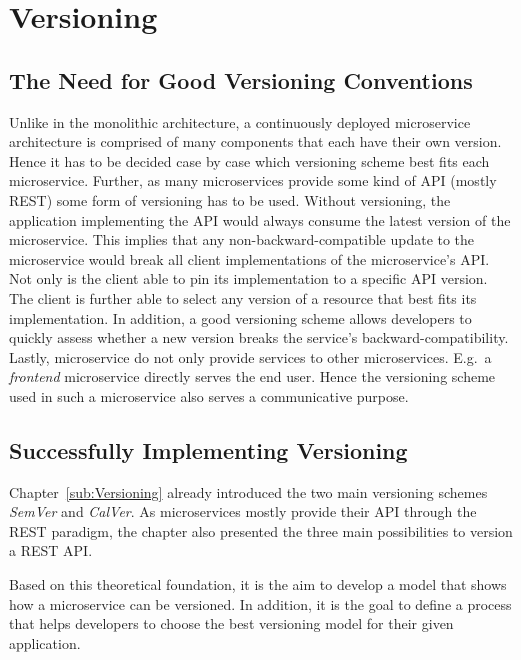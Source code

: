 
\section{Versioning}%
\label{sec:Versioning}

\subsection{The Need for Good Versioning Conventions}%
\label{sub:The_Need_for_Good_Versioning_Conventions}
Unlike in the monolithic architecture, a continuously deployed microservice
architecture is comprised of many components that each have their own version.
Hence it has to be decided case by case which versioning scheme best fits each
microservice. Further, as many microservices provide some kind of \ac{API}
(mostly \ac{REST}) some form of versioning has to be used. Without versioning,
the application implementing the \ac{API} would always consume the latest
version of the microservice. This implies that any non-backward-compatible
update to the microservice would break all client implementations of the
microservice's \ac{API}. Not only is the client able to pin its implementation
to a specific \ac{API} version. The client is further able to select any
version of a resource that best fits its implementation. In addition, a good
versioning scheme allows developers to quickly assess whether a new version
breaks the service's backward-compatibility. Lastly, microservice do not only
provide services to other microservices. E.g.\ a \textit{frontend} microservice
directly serves the end user. Hence the versioning scheme used in such a
microservice also serves a communicative purpose.


\subsection{Successfully Implementing Versioning}%
\label{sub:Successfully_Implementing_Versioning}
Chapter~\ref{sub:Versioning} already introduced the two main versioning schemes
\textit{SemVer} and \textit{CalVer}. As microservices mostly provide their
\ac{API} through the \ac{REST} paradigm, the chapter also presented the three
main possibilities to version a \ac{REST} \ac{API}.

Based on this theoretical foundation, it is the aim to develop a model that
shows how a microservice can be versioned. In addition, it is the goal to
define a process that helps developers to choose the best versioning model for
their given application.

